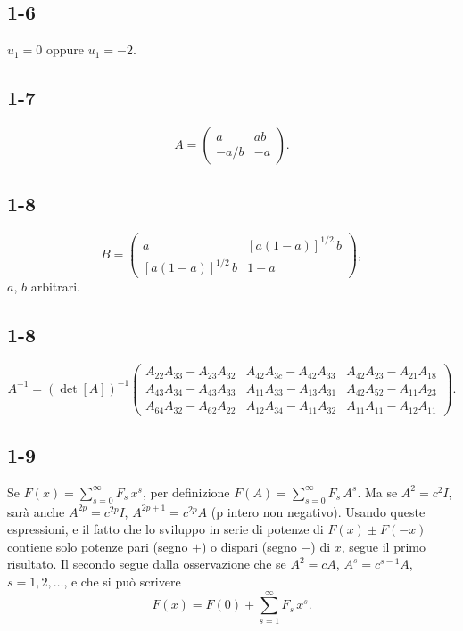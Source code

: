 \documentclass[11pt, a4paper]{book}
\numberwithin{equation}{section}
\begin{document}
\subsection*{1-6} $u_1 = 0$ oppure $u_1 = -2$.

\subsection*{1-7}
\[
A = \begin{pmatrix} a & ab \\ -a/b & -a \end{pmatrix}.
\]


\subsection*{1-8}
\[
B =
\begin{pmatrix}
a & [a(1-a)]^{1/2}\,b \\
[a(1-a)]^{1/2}\,b & 1-a
\end{pmatrix},
\]
$a$, $b$ arbitrari.

\subsection*{1-8} %
\[
A^{-1} = (\det[A])^{-1}
\begin{pmatrix}
A_{22}A_{33}-A_{23}A_{32} & A_{42}A_{3c}-A_{42}A_{33} & A_{42}A_{23}-A_{21}A_{18} \\ %
A_{43}A_{34}-A_{43}A_{33} & A_{11}A_{33}-A_{13}A_{31} & A_{42}A_{52}-A_{11}A_{23} \\ %
A_{64}A_{32}-A_{62}A_{22} & A_{12}A_{34}-A_{11}A_{32} & A_{11}A_{11}-A_{12}A_{11}  %
\end{pmatrix}.
\]

\subsection*{1-9}
Se $F(x) = \sum_{s=0}^{\infty} F_s\,x^s$, per definizione
$F(A) = \sum_{s=0}^{\infty} F_s\,A^s$. Ma se $A^2 = c^2 I$, sarà
anche $A^{2p} = c^{2p} I$, $A^{2p+1} = c^{2p} A$ (p intero non
negativo). Usando queste espressioni, e il fatto che lo sviluppo in serie
di potenze di $F(x) \pm F(-x)$ contiene solo potenze pari (segno $+$) o
dispari (segno $-$) di $x$, segue il primo risultato. Il secondo segue
dalla osservazione che se $A^2 = cA$, $A^s = c^{s-1}A$, $s = 1,2,\ldots$,
e che si può scrivere
\[
F(x) = F(0) + \sum_{s=1}^{\infty} F_s\,x^s.
\]
\end{document}
